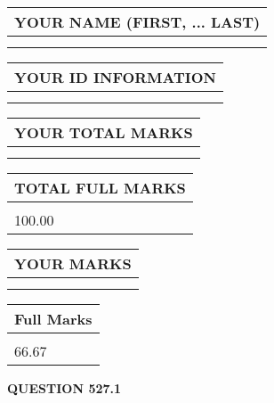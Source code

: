 \documentclass{ctexart}
\begin{document}
   
   
   
\newpage 
\setcounter{page}{ 
   527001 } 
   
   
   
   
\noindent\begin{tabular}{|l|}
\hline
YOUR NAME (FIRST, ... LAST)  \\
\hline
 \\ 
 \\ 
\hline
\end{tabular}
\hspace{0.05in} \begin{tabular}{|l|}
\hline
 YOUR   ID   INFORMATION  \\
\hline
 \\ 
 \\ 
\hline
\end{tabular}
   
   
\vspace{0.2in}\noindent\begin{tabular}{|l|}
\hline
YOUR TOTAL MARKS  \\
\hline
 \\ 
 \\ 
\hline
\end{tabular}
\hspace{0.05in} \begin{tabular}{|l|}
\hline
TOTAL FULL MARKS  \\
\hline
 \\ 
100.00 \\
\hline
\end{tabular}
   
   
 \vspace{0.2in}
 
 
 
 
   
   
  
\vspace{0.2in}
  
\noindent\begin{tabular}{|l|}
\hline
 YOUR MARKS  \\
\hline
 \\ 
 \\ 
\hline
\end{tabular}
\hspace{0.05in} \begin{tabular}{|l|}
\hline
 Full Marks  \\
\hline
 \\ 
66.67 \\
\hline
\end{tabular}
{\textbf{\Large{QUESTION
527.1 
}}}
  
\end{document}

